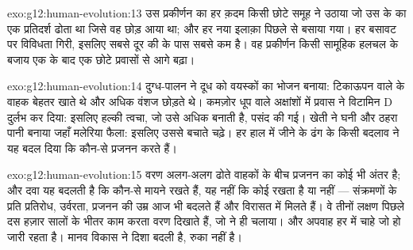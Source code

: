 \begin{solution}{exo:g12:human-evolution:13}
उस प्रकीर्णन का हर क़दम किसी छोटे समूह ने उठाया जो उस  के
 का एक प्रतिदर्श ढोता था जिसे वह छोड़ आया था; और हर नया
इलाक़ा पिछले से बसाया गया। हर बसावट पर विविधता गिरी, इसलिए सबसे दूर की
 के पास सबसे कम है। वह प्रकीर्णन किसी सामूहिक हलचल के बजाय एक के
बाद एक छोटे प्रवासों से आगे बढ़ा।
\end{solution}

\begin{solution}{exo:g12:human-evolution:14}
दुग्ध-पालन ने दूध को वयस्कों का भोजन बनाया: टिकाऊपन वाले  के
वाहक बेहतर खाते थे और अधिक वंशज छोड़ते थे। कमज़ोर धूप वाले अक्षांशों में
प्रवास ने विटामिन D दुर्लभ कर दिया: इसलिए हल्की त्वचा, जो उसे अधिक बनाती
है, पसंद की गई। खेती ने घनी  और ठहरा पानी बनाया जहाँ मलेरिया फैला:
इसलिए उससे बचाते  चढ़े। हर हाल में जीने के ढंग के किसी बदलाव ने
यह बदल दिया कि कौन-से  प्रजनन करते हैं।
\end{solution}

\begin{solution}{exo:g12:human-evolution:15}
वरण अलग-अलग  ढोते वाहकों के बीच प्रजनन का कोई भी अंतर है; और
दवा यह बदलती है कि कौन-से  मायने रखते हैं, यह नहीं कि कोई रखता
है या नहीं --- संक्रमणों के प्रति प्रतिरोध, उर्वरता, प्रजनन की उम्र आज भी
बदलते हैं और विरासत में मिलते हैं। वे तीनों लक्षण पिछले दस हज़ार सालों के
भीतर काम करता वरण दिखाते हैं, जो  ने ही चलाया। और अपवाह हर  में
चाहे जो हो जारी रहता है। मानव विकास ने दिशा बदली है, रुका नहीं है।
\end{solution}

